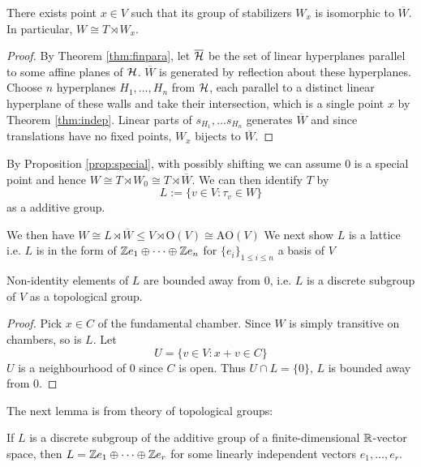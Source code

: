 \documentclass[../main.tex]{subfiles}
\begin{document}
\begin{proposition}\label{prop:special}
    There exists point $x\in V$ such that its group of stabilizers $W_x$ is isomorphic to $\overline W$. In particular, $W\cong T\rtimes W_x$.
\end{proposition}

\begin{proof}
    By Theorem \ref{thm:finpara}, let $\overline {\mathcal{H}}$ be the set of linear hyperplanes parallel to some affine planes of $\mathcal{H}$. $\overline W$ is generated by reflection about these hyperplanes.  Choose $n$ hyperplanes $H_1,\dots,H_n$ from $\mathcal{H}$, each parallel to a distinct linear hyperplane of these walls and take their intersection, which is a single point $x$ by Theorem \ref{thm:indep}. Linear parts of $s_{H_1},\dots s_{H_n}$ generates $\overline W$ and since translations have no fixed points, $W_x$ bijects to $\overline W$.
\end{proof}

By Proposition \ref{prop:special}, with possibly shifting we can assume $0$ is a special point and hence $W\cong T\rtimes W_0\cong T \rtimes \overline W$. We can then identify $T$ by \[
L := \{v \in V : \tau_v \in W\}
\]
as a additive group. 

We then have $W\cong L\rtimes \overline W\leq V \rtimes \text{O}(V)\cong \text{AO}(V)$
We next show $L$ is a lattice i.e.   $L$ is in the form of $\mathbb{Z} e_1\oplus \dots \oplus \mathbb{Z} e_n$ for $\{e_i\}_{1\leq i\leq n}$ a basis of $V$


\begin{lemma}
    Non-identity elements of $L$ are bounded away from $0$, i.e. $L$ is a discrete subgroup of $V$ as a topological group. 
\end{lemma}

\begin{proof}
    Pick $x\in C$ of the fundamental chamber. Since $W$ is simply transitive on chambers, so is $L$. Let \[U=\{v\in V:x+v \in C\}\]
    $U$ is a neighbourhood of $0$ since $C$ is open. Thus $U\cap L=\{0\}$, $L$ is bounded away from $0$.
\end{proof}

The next lemma is from theory of topological groups:

\begin{lemma}\label{lem:latt}
    If $L$ is a discrete subgroup of the additive group of a finite-dimensional $\mathbb{R}$-vector space, then $L=\mathbb{Z} e_1\oplus\dots\oplus \mathbb{Z} e_r$ for some linearly independent vectors $e_1,\dots,e_r$. 
\end{lemma}
\end{document}
